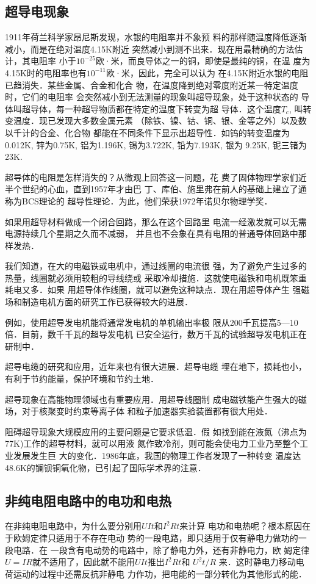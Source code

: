 \subsection{超导电现象}
1911年荷兰科学家昂尼斯发现，水银的电阻率并不象预
料的那样随温度降低逐渐减小，而是在绝对温度4.15K附近
突然减小到测不出来．现在用最精确的方法估计，其电阻率
小于$10^{-25}$欧·米，而良导体之一的铜，即使是最纯的铜，在温
度为4.15K时的电阻率也有$10^{-11}$欧·米，因此，完全可以认为
在4.15K附近水银的电阻已趋消失．某些金属、合金和化合
物，在温度降到绝对零度附近某一特定温度时，它们的电阻率
会突然减小到无法测量的现象叫超导现象，处于这种状态的
导体叫超导体，每一种超导物质都在特定的温度下转变为超
导体．这个温度$T_c$, 叫转变温度．现已发现大多数金属元素
（除铁、镍、钴、铜、银、金等之外）以及数以千计的合金、化合物
都能在不同条件下显示出超导性．如钨的转变温度为0.012K,
锌为0.75K, 铝为1.196K, 锡为3.722K, 铅为7.193K, 银为
9.25K, 铌三锗为23K.

超导体的电阻是怎样消失的？从微观上回答这一问题，花
费了固体物理学家们近半个世纪的心血，直到1957年才由巴
丁、库伯、施里弗在前人的基础上建立了通称为BCS理论的
超导性理论．为此，他们荣获1972年诺贝尔物理学奖．

如果用超导材料做成一个闭合回路，那么在这个回路里
电流一经激发就可以无需电源持续几个星期之久而不减弱，
并且也不会象在具有电阻的普通导体回路中那样发热．

我们知道，在大的电磁铁或电机中，通过线圈的电流很
强，为了避免产生过多的热量，线圈就必须用较粗的导线绕或
采取冷却措施．这就使电磁铁和电机既笨重耗电又多．如果
用超导体作线圈，就可以避免这种缺点．现在用超导体产生
强磁场和制造电机方面的研究工作已获得较大的进展．

例如，使用超导发电机能将通常发电机的单机输出率极
限从200千瓦提高5—10倍．目前，数千千瓦的超导发电机
已安全运行，数万千瓦的试验超导发电机正在研制中．

超导电缆的研究和应用，近年来也有很大进展．超导电缆
埋在地下，损耗也小，有利于节约能量，保护环境和节约土地．

超导现象在高能物理领域也有重要应用．用超导线圈制
成电磁铁能产生强大的磁场，对于核聚变时约束等离子体
和粒子加速器实验装置都有很大用处．

阻碍超导现象大规模应用的主要问题是它要求低温．假
如找到能在液氮（沸点为77K)工作的超导材料，就可以用液
氮作致冷剂，则可能会使电力工业乃至整个工业发展发生巨
大的变化．1986年底，我国的物理工作者发现了一种转变
温度达48.6K的镧钡铜氧化物，已引起了国际学术界的注意．

\subsection{非纯电阻电路中的电功和电热}
在非纯电阻电路中，为什么要分别用$UIt$和$I^2Rt$来计算
电功和电热呢？根本原因在于欧姆定律只适用于不存在电动
势的一段电路，即只适用于仅有静电力做功的一段电路．在
一段含有电动势的电路中，除了静电力外，还有非静电力，欧
姆定律$U=IR$就不适用了，因此就不能用$UIt$推出$I^2Rt$和
$U^2t/R$
来．这时静电力移动电荷运动的过程中还需反抗非静电
力作功，把电能的一部分转化为其他形式的能．

